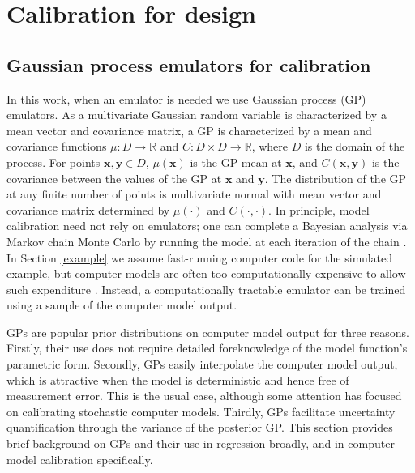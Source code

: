 \documentclass[12pt]{article}
\begin{document}
%
\section{Calibration for design}\label{calib_for_design}

%
\subsection{Gaussian process emulators for calibration}
%
In this work, when an emulator is needed we use Gaussian process (GP) emulators.
%
As a multivariate Gaussian random variable is characterized by a mean vector and covariance matrix, a GP is characterized by a mean and covariance functions $\mu:D\to \mathbb R$ and $C:D\times D\to \mathbb R$, where $D$ is the domain of the process. 
%
For points $\mathbf x,\mathbf y\in D$, $\mu(\mathbf x)$ is the GP mean at $\mathbf x$, and $C(\mathbf x, \mathbf y)$ is the covariance between the values of the GP at $\mathbf x$ and $\mathbf y$.
%
The distribution of the GP at any finite number of points is multivariate normal with mean vector and covariance matrix determined by $\mu(\cdot)$ and $C(\cdot,\cdot)$.
%
In principle, model calibration need not rely on emulators; one can complete a Bayesian analysis via Markov chain Monte Carlo \citep[MCMC;][]{Gelfand1990} by running the model at each iteration of the chain \citep[see e.g.][]{Hemez2011}. 
%
In Section \ref{example} we assume fast-running computer code for the simulated example, but
%
computer models are often too computationally expensive to allow such expenditure \citep{VanBuren2013,VanBuren2014}.
%
Instead, a computationally tractable emulator can be trained using a sample of the computer model output. 
%

%
GPs are popular prior distributions on computer model output for three reasons.
%
Firstly, their use does not require detailed foreknowledge of the model function's parametric form. 
%
Secondly, GPs easily interpolate the computer model output, which is attractive when the model is deterministic and hence free of measurement error. 
%
This is the usual case, although some attention \citep[e.g.,][]{Pratola2018} has focused on calibrating stochastic computer models. 
%
Thirdly, GPs facilitate uncertainty quantification through the variance of the posterior GP. 
%
This section provides brief background on GPs and their use in regression broadly, and in computer model calibration specifically.
%
\end{document}
